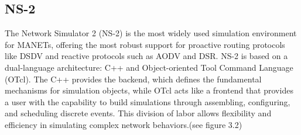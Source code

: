 \documentclass[]{nsm-thesis}
\begin{document}
\subsection{NS-2}
The Network Simulator 2 (NS-2) is the most widely used simulation environment for MANETs, offering the most robust support for proactive routing protocols like DSDV and reactive protocols such as AODV and DSR\cite{refId0}. NS-2 is based on a dual-language architecture: C++ and Object-oriented Tool Command Language (OTcl). The C++ provides the backend, which defines the fundamental mechanisms for simulation objects, while OTcl acts like a frontend that provides a user with the capability to build simulations through assembling, configuring, and scheduling discrete events. This division of labor allows flexibility and efficiency in simulating complex network behaviors.(see figure 3.2)
\end{document}
